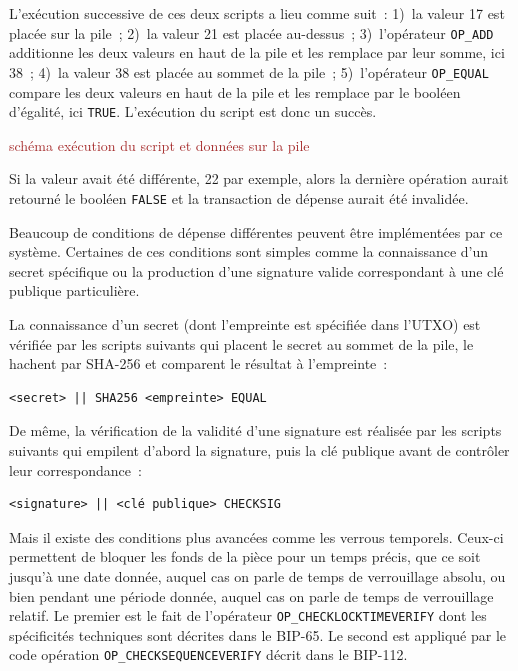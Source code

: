 L'exécution successive de ces deux scripts a lieu comme suit~: 1)~la valeur 17 est placée sur la pile~; 2)~la valeur 21 est placée au-dessus~; 3)~l'opérateur \texttt{OP\_ADD} additionne les deux valeurs en haut de la pile et les remplace par leur somme, ici 38~; 4)~la valeur 38 est placée au sommet de la pile~; 5)~l'opérateur \texttt{OP\_EQUAL} compare les deux valeurs en haut de la pile et les remplace par le booléen d'égalité, ici \texttt{TRUE}. L'exécution du script est donc un succès.

\textcolor{brown}{schéma exécution du script et données sur la pile}

Si la valeur avait été différente, 22 par exemple, alors la dernière opération aurait retourné le booléen \texttt{FALSE} et la transaction de dépense aurait été invalidée.


Beaucoup de conditions de dépense différentes peuvent être implémentées par ce système. Certaines de ces conditions sont simples comme la connaissance d'un secret spécifique ou la production d'une signature valide correspondant à une clé publique particulière.

La connaissance d'un secret (dont l'empreinte est spécifiée dans l'UTXO) est vérifiée par les scripts suivants qui placent le secret au sommet de la pile, le hachent par SHA-256 et comparent le résultat à l'empreinte~:

\begin{Verbatim}[fontsize=\small]
<secret> || SHA256 <empreinte> EQUAL
\end{Verbatim}

De même, la vérification de la validité d'une signature est réalisée par les scripts suivants qui empilent d'abord la signature, puis la clé publique avant de contrôler leur correspondance~:

\begin{Verbatim}[fontsize=\small]
<signature> || <clé publique> CHECKSIG
\end{Verbatim}

Mais il existe des conditions plus avancées comme les verrous temporels. Ceux-ci permettent de bloquer les fonds de la pièce pour un temps précis, que ce soit jusqu'à une date donnée, auquel cas on parle de temps de verrouillage absolu, ou bien pendant une période donnée, auquel cas on parle de temps de verrouillage relatif. Le premier est le fait de l'opérateur \texttt{OP\_CHECKLOCKTIMEVERIFY} dont les spécificités techniques sont décrites dans le BIP-65. Le second est appliqué par le code opération \texttt{OP\_CHECKSEQUENCEVERIFY} décrit dans le BIP-112.

